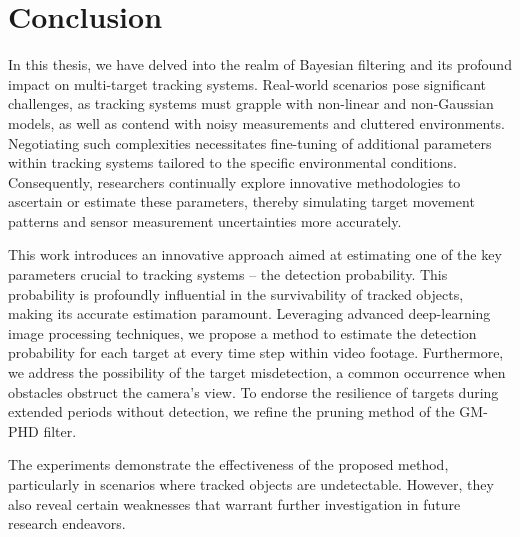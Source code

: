\chapter{Conclusion}
%
%

In this thesis, we have delved into the realm of Bayesian filtering and its profound impact on multi-target tracking
systems. Real-world scenarios pose significant challenges, as tracking systems must grapple with non-linear and non-Gaussian models, as well as contend with noisy measurements and cluttered environments. Negotiating such complexities necessitates fine-tuning of additional parameters within tracking systems tailored to the specific environmental conditions. Consequently, researchers continually explore innovative methodologies to ascertain or estimate these parameters, thereby simulating target movement patterns and sensor measurement uncertainties more accurately.

This work introduces an innovative approach aimed at estimating one of the key parameters crucial to tracking systems --
the detection probability. This probability is profoundly influential in the survivability of tracked objects, making
its
accurate
estimation paramount. Leveraging advanced deep-learning image processing techniques, we propose a method to estimate
the detection probability for each target at every time step within video footage. Furthermore, we address the
possibility of the target misdetection, a common occurrence when obstacles obstruct the camera's view. To endorse the
resilience of targets during extended periods without detection, we refine the pruning method of the GM-PHD filter.

The experiments demonstrate the effectiveness of the proposed method, particularly in scenarios where tracked objects are undetectable. However, they also reveal certain weaknesses that warrant further investigation in future research endeavors.




